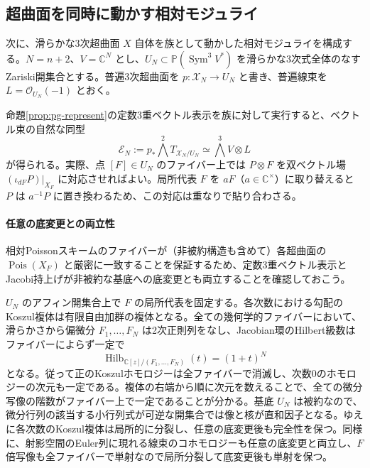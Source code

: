 \subsection{超曲面を同時に動かす相対モジュライ}
次に、滑らかな3次超曲面 $X$ 自体を族として動かした相対モジュライを構成する。$N=n+2$、$V=\mathbb C^N$ とし、$U_N\subset\mathbb P(\operatorname{Sym}^3V^*)$ を滑らかな3次式全体のなすZariski開集合とする。普遍3次超曲面を $p:\mathscr X_N\to U_N$ と書き、普遍線束を $L=\mathcal O_{U_N}(-1)$ とおく。

命題\ref{prop:pg-represent}の定数3重ベクトル表示を族に対して実行すると、ベクトル束の自然な同型
\begin{equation}\label{eq:pg-relative-pois-bundle}
  \mathscr E_N:=p_*\bigwedge^2T_{\mathscr X_N/U_N}
  \simeq\bigwedge^3V\otimes L
\end{equation}
が得られる。実際、点 $[F]\in U_N$ のファイバー上では $P\otimes F$ を双ベクトル場 $(\iota_{dF}P)|_{X_F}$ に対応させればよい。局所代表 $F$ を $aF$（$a\in\mathbb C^\times$）に取り替えると $P$ は $a^{-1}P$ に置き換わるため、この対応は重なりで貼り合わさる。

\paragraph{任意の底変更との両立性}
相対Poissonスキームのファイバーが（非被約構造も含めて）各超曲面の $\operatorname{Pois}(X_F)$ と厳密に一致することを保証するため、定数3重ベクトル表示とJacobi持上げが非被約な基底への底変更とも両立することを確認しておこう。

$U_N$ のアフィン開集合上で $F$ の局所代表を固定する。各次数における勾配のKoszul複体は有限自由加群の複体となる。全ての幾何学的ファイバーにおいて、滑らかさから偏微分 $F_1,\ldots,F_N$ は2次正則列をなし、Jacobian環のHilbert級数はファイバーによらず一定で
\begin{equation}\label{eq:pg-stack-gradient-hilbert}
  \operatorname{Hilb}_{\mathbb C[z]/(F_1,\ldots,F_N)}(t)=(1+t)^N
\end{equation}
となる。従って正のKoszulホモロジーは全ファイバーで消滅し、次数0のホモロジーの次元も一定である。複体の右端から順に次元を数えることで、全ての微分写像の階数がファイバー上で一定であることが分かる。基底 $U_N$ は被約なので、微分行列の該当する小行列式が可逆な開集合では像と核が直和因子となる。ゆえに各次数のKoszul複体は局所的に分裂し、任意の底変更後も完全性を保つ。同様に、射影空間のEuler列に現れる線束のコホモロジーも任意の底変更と両立し、$F$ 倍写像も全ファイバーで単射なので局所分裂して底変更後も単射を保つ。

